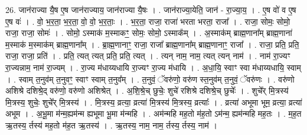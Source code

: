 \documentclass[17pt]{extarticle}
\begin{document}
26. जान॑राज्या यै॒ष ए॒ष जान॑राज्याय॒ जान॑राज्या यै॒षः । . जान॑राज्या॒येति॒ जान॑ - रा॒ज्या॒य॒ । . ए॒ष वो॑ व ए॒ष ए॒ष वः॑ । . वो॒ भ॒र॒ता॒ भ॒र॒ता॒ वो॒ वो॒ भ॒र॒ताः॒ । . भ॒र॒ता॒ राजा॒ राजा॑ भरता भरता॒ राजा᳚ । . राजा॒ सोमः॒ सोमो॒ राजा॒ राजा॒ सोमः॑ । . सोमो॒ ऽस्माक॑ म॒स्माकꣳ॒॒ सोमः॒ सोमो॒ ऽस्माक᳚म् । . अ॒स्माक॑म् ब्राह्म॒णाना᳚म् ब्राह्म॒णाना॑ म॒स्माक॑ म॒स्माक॑म् ब्राह्म॒णाना᳚म् । . ब्रा॒ह्म॒णानाꣳ॒॒ राजा॒ राजा᳚ ब्राह्म॒णाना᳚म् ब्राह्म॒णानाꣳ॒॒ राजा᳚ । . राजा॒ प्रति॒ प्रति॒ राजा॒ राजा॒ प्रति॑ । . प्रति॒ त्यत् त्यत् प्रति॒ प्रति॒ त्यत् । . त्यन् नाम॒ नाम॒ त्यत् त्यन् नाम॑ । . नाम॑ रा॒ज्यꣳ रा॒ज्यन्नाम॒ नाम॑ रा॒ज्यम् । . रा॒ज्य म॑धाय्यधायि रा॒ज्यꣳ रा॒ज्य म॑धायि । . अ॒धा॒यि॒ स्वाꣳ स्वा म॑धाय्यधायि॒ स्वाम् । . स्वाम् त॒नुव॑म् त॒नुवꣳ॒॒ स्वाꣳ स्वाम् त॒नुव᳚म् । . त॒नुवं॒ ॅवरु॑णो॒ वरु॑ण स्त॒नुव॑म् त॒नुवं॒ ॅवरु॑णः । . वरु॑णो अशिश्रे दशिश्रे॒द् वरु॑णो॒ वरु॑णो अशिश्रेत् । . अ॒शि॒श्रे॒च् छुचेः॒ शुचे॑ रशिश्रे दशिश्रे॒च् छुचेः᳚ । . शुचे᳚र् मि॒त्रस्य॑ मि॒त्रस्य॒ शुचेः॒ शुचे᳚र् मि॒त्रस्य॑ । . मि॒त्रस्य॒ व्रत्या॒ व्रत्या॑ मि॒त्रस्य॑ मि॒त्रस्य॒ व्रत्याः᳚ । . व्रत्या॑ अभूमा भूम॒ व्रत्या॒ व्रत्या॑ अभूम । . अ॒भू॒मा म॑न्म॒ह्यम॑न्म ह्यभूमा भू॒मा म॑न्महि । . अम॑न्महि मह॒तो म॑ह॒तो ऽम॑न्म॒ ह्यम॑न्महि मह॒तः । . म॒ह॒त ऋ॒तस्य॒ र्तस्य॑ मह॒तो म॑ह॒त ऋ॒तस्य॑ । . ऋ॒तस्य॒ नाम॒ नाम॒ र्तस्य॒ र्तस्य॒ नाम॑ । \newline
\end{document}
